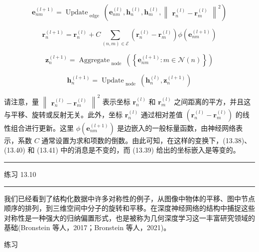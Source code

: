 \documentclass[10pt]{article}
\newcommand{\HRule}{\begin{center}\rule{0.9\linewidth}{0.2mm}\end{center}}
\begin{document}
\[
{\mathbf{e}}_{nm}^{\left( l + 1\right) } = {\operatorname{Update}}_{\text{ edge }}\left( {{\mathbf{e}}_{nm}^{\left( l\right) },{\mathbf{h}}_{n}^{\left( l\right) },{\mathbf{h}}_{m}^{\left( l\right) },{\begin{Vmatrix}{\mathbf{r}}_{n}^{\left( l\right) } - {\mathbf{r}}_{m}^{\left( l\right) }\end{Vmatrix}}^{2}}\right)  \tag{13.38}
\]

\[
{\mathbf{r}}_{n}^{\left( l + 1\right) } = {\mathbf{r}}_{n}^{\left( l\right) } + C\mathop{\sum }\limits_{{\left( {n,m}\right)  \in  \mathcal{E}}}\left( {{\mathbf{r}}_{n}^{\left( l\right) } - {\mathbf{r}}_{m}^{\left( l\right) }}\right) \phi \left( {\mathbf{e}}_{nm}^{\left( l + 1\right) }\right)  \tag{13.39}
\]

\[
{\mathbf{z}}_{n}^{\left( l + 1\right) } = {\operatorname{Aggregate}}_{\text{ node }}\left( \left\{  {{\mathbf{e}}_{nm}^{\left( l + 1\right) } : m \in  \mathcal{N}\left( n\right) }\right\}  \right)  \tag{13.40}
\]

\[
{\mathbf{h}}_{n}^{\left( l + 1\right) } = {\operatorname{Update}}_{\text{ node }}\left( {{\mathbf{h}}_{n}^{\left( l\right) },{\mathbf{z}}_{n}^{\left( l + 1\right) }}\right)  \tag{13.41}
\]

请注意，量 \({\begin{Vmatrix}{\mathbf{r}}_{n}^{\left( l\right) } - {\mathbf{r}}_{m}^{\left( l\right) }\end{Vmatrix}}^{2}\) 表示坐标 \({\mathbf{r}}_{n}^{\left( l\right) }\) 和 \({\mathbf{r}}_{m}^{\left( l\right) }\) 之间距离的平方，并且这与平移、旋转或反射无关。此外，坐标 \({\mathbf{r}}_{n}^{\left( l\right) }\) 通过相对差值 \(\left( {{\mathbf{r}}_{n}^{\left( l\right) } - {\mathbf{r}}_{m}^{\left( l\right) }}\right)\) 的线性组合进行更新。这里 \(\phi \left( {\mathbf{e}}_{nm}^{\left( l + 1\right) }\right)\) 是边嵌入的一般标量函数，由神经网络表示，系数 \(C\) 通常设置为求和项数的倒数。由此可知，在这样的变换下，(13.38)、(13.40) 和 (13.41) 中的消息是不变的，而 (13.39) 给出的坐标嵌入是等变的。

\HRule

练习 13.10

\HRule

我们已经看到了结构化数据中许多对称性的例子，从图像中物体的平移、图中节点顺序的排列，到三维空间中分子的旋转和平移。在深度神经网络的结构中捕捉这些对称性是一种强大的归纳偏置形式，也是被称为几何深度学习这一丰富研究领域的基础(Bronstein 等人，2017；Bronstein 等人，2021)。

练习
\end{document}
